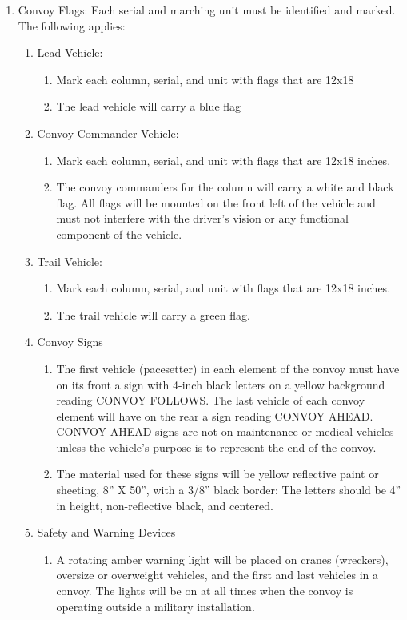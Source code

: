 \documentclass{article}
\begin{document}
\begin{enumerate}
\item Convoy Flags: Each serial and marching unit must be identified and marked.  The following applies:
\begin{enumerate}
    \item Lead Vehicle:
    \begin{enumerate}
        \item Mark each column, serial, and unit with flags that are 12x18 \item The lead vehicle will carry a blue flag
\end{enumerate}
\item Convoy Commander Vehicle:
\begin{enumerate}
    \item Mark each column, serial, and unit with flags that are 12x18 inches. 
\item The convoy commanders for the column will carry a white and black flag.  All flags will be mounted on the front left of the vehicle and must not interfere with the driver’s vision or any functional component of the vehicle. 
\end{enumerate}
\item Trail Vehicle:
\begin{enumerate}
    \item Mark each column, serial, and unit with flags that are 12x18 inches. 
\item The trail vehicle will carry a green flag. 
\end{enumerate}
\item	Convoy Signs
\begin{enumerate}
    \item The first vehicle (pacesetter) in each element of the convoy must have on its front a sign with 4-inch black letters on a yellow background reading CONVOY FOLLOWS. The last vehicle of each convoy element will have on the rear a sign reading CONVOY AHEAD. CONVOY AHEAD signs are not on maintenance or medical vehicles unless the vehicle's purpose is to represent the end of the convoy. 
\item The material used for these signs will be yellow reflective paint or sheeting, 8” X 50”, with a 3/8” black border:  The letters should be 4” in height, non-reflective black, and centered.
\end{enumerate}
\item	Safety and Warning Devices
\begin{enumerate}
    \item 	A rotating amber warning light will be placed on cranes (wreckers), oversize or overweight vehicles, and the first and last vehicles in a convoy. The lights will be on at all times when the convoy is operating outside a military installation.

\end{enumerate}
\end{enumerate}
\end{enumerate}
\end{document}
